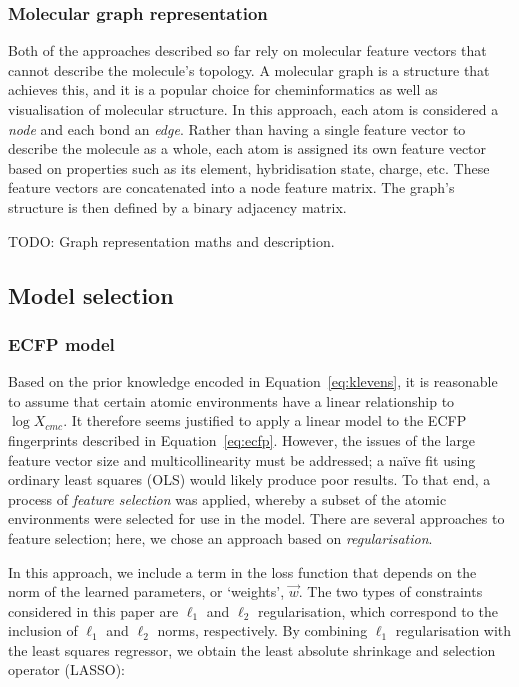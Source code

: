 \subsubsection{Molecular graph representation}

Both of the approaches described so far rely on molecular feature vectors that
cannot describe the molecule's topology. A molecular graph is a structure that
achieves this, and it is a popular choice for cheminformatics as well as
visualisation of molecular structure. In this approach, each atom is considered
a \emph{node} and each bond an \emph{edge}. Rather than having a single feature
vector to describe the molecule as a whole, each atom is assigned its own
feature vector based on properties such as its element, hybridisation state,
charge, etc. These feature vectors are concatenated into a node feature matrix.
The graph's structure is then defined by a binary adjacency matrix.

TODO: Graph representation maths and description.

\subsection{Model selection}

\subsubsection{ECFP model}

Based on the prior knowledge encoded in Equation~\ref{eq:klevens}, it is
reasonable to assume that certain atomic environments have a linear relationship
to $\log X_{cmc}$. It therefore seems justified to apply a linear model to the
ECFP fingerprints described in Equation~\ref{eq:ecfp}. However, the issues of
the large feature vector size and multicollinearity must be addressed; a na\"ive
fit using ordinary least squares (OLS) would likely produce poor results. To
that end, a process of \emph{feature selection} was applied, whereby a subset of
the atomic environments were selected for use in the model. There are several
approaches to feature selection\cite{liFeatureSelectionData2017}; here, we chose
an approach based on \emph{regularisation}.

In this approach, we include a term in the loss function that depends on the
norm of the learned parameters, or `weights', $\vec{w}$. The two types of constraints
considered in this paper are $\ell_1$ and $\ell_2$ regularisation, which correspond to
the inclusion of $\ell_1$ and $\ell_2$ norms, respectively. By combining $\ell_1$
regularisation with the least squares regressor, we obtain the least absolute
shrinkage and selection operator (LASSO)\cite{tibshiraniRegressionShrinkageSelection1996}:

